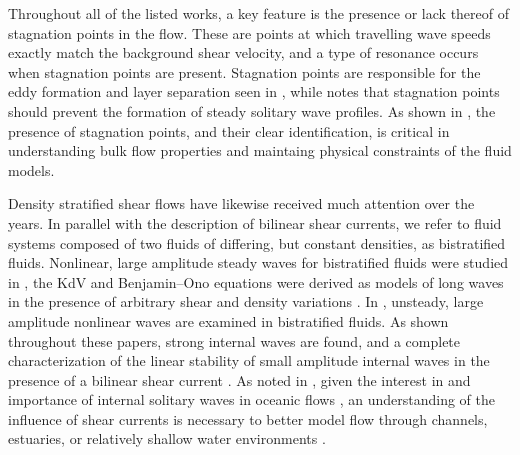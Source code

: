 \documentclass[a4paper,11pt]{article}
\begin{document}
Throughout all of the listed works, a key feature is the presence or lack thereof of stagnation points in the flow.  These are points at which travelling wave speeds exactly match the background shear velocity, and a type of resonance occurs when stagnation points are present.  Stagnation points are responsible for the eddy formation and layer separation seen in \cite{dasilva}, while \cite{benjamin} notes that stagnation points should prevent the formation of steady solitary wave profiles.  As shown in \cite{oliveras}, the presence of stagnation points, and their clear identification, is critical in understanding bulk flow properties and maintaing physical constraints of the fluid models.  

Density stratified shear flows have likewise received much attention over the years.  In parallel with the description of bilinear shear currents, we refer to fluid systems composed of two fluids of differing, but constant densities, as bistratified fluids.  Nonlinear, large amplitude steady waves for bistratified fluids were studied in \cite{pullin2,pullin4}, the KdV and Benjamin--Ono equations were derived as models of long waves in the presence of arbitrary shear and density variations \cite{maslowe}.  In \cite{milewski}, unsteady, large amplitude nonlinear waves are examined in bistratified fluids.  As shown throughout these papers, strong internal waves are found, and a complete characterization of the linear stability of small amplitude internal waves in the presence of a bilinear shear current \cite{pullin3}.   As noted in \cite{maslowe}, given the interest in and importance of internal solitary waves in oceanic flows \cite{appel,zhao}, an understanding of the influence of shear currents is necessary to better model flow through channels, estuaries, or relatively shallow water environments \cite{farmer}.  
\end{document}
